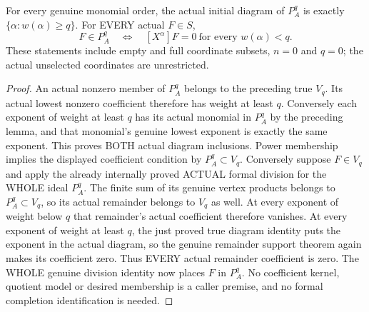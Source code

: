 \begin{theorem}
\label{hir:actual-formal-coordinate-power-coefficient-kernel}
For every genuine monomial order, the actual initial diagram of $P_A^q$
is exactly $\{\alpha:w(\alpha)\ge q\}$. For EVERY actual $F\in S$,
\[
 F\in P_A^q\quad\Longleftrightarrow\quad
 [X^\alpha]F=0\ \text{for every }w(\alpha)<q.
\]
These statements include empty and full coordinate subsets, $n=0$ and
$q=0$; the actual unselected coordinates are unrestricted.
\leanok
\end{theorem}
\begin{proof}
An actual nonzero member of $P_A^q$ belongs to the preceding true
$V_q$. Its actual lowest nonzero coefficient therefore has weight at
least $q$. Conversely each exponent of weight at least $q$ has its
actual monomial in $P_A^q$ by the preceding lemma, and that monomial's
genuine lowest exponent is exactly the same exponent. This proves BOTH
actual diagram inclusions.
Power membership implies the displayed coefficient condition by
$P_A^q\subset V_q$. Conversely suppose $F\in V_q$ and apply
the already internally proved ACTUAL formal division for the WHOLE ideal
$P_A^q$. The finite sum of its genuine vertex products belongs to
$P_A^q\subset V_q$, so its actual remainder belongs to $V_q$ as
well. At every exponent of weight below $q$ that remainder's actual
coefficient therefore vanishes. At every exponent of weight at least
$q$, the just proved true diagram identity puts the exponent in the
actual diagram, so the genuine remainder support theorem again makes
its coefficient zero. Thus EVERY actual remainder coefficient is zero.
The WHOLE genuine division identity now places $F$ in $P_A^q$.
No coefficient kernel, quotient model or desired membership is a caller
premise, and no formal completion identification is needed.
\end{proof}

